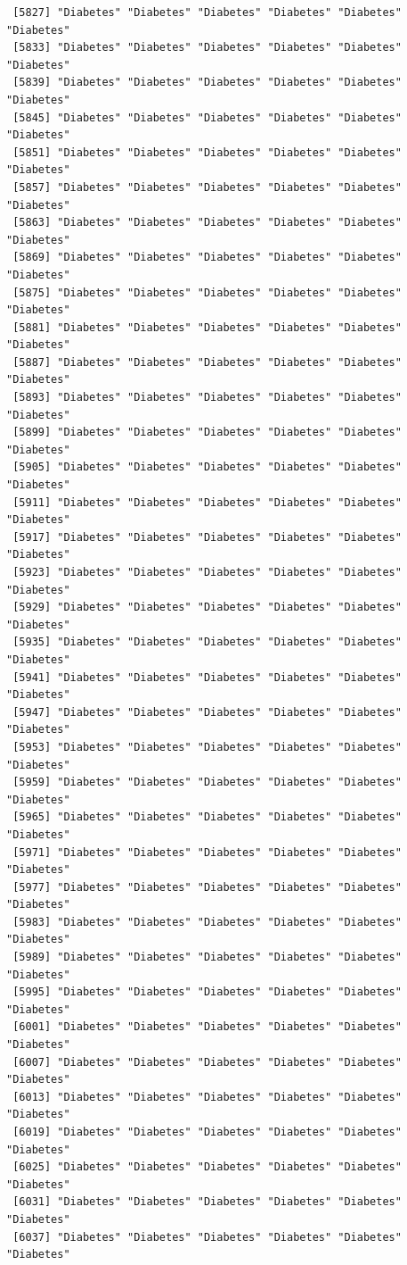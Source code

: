 \documentclass[
  letterpaper,
  DIV=11,
  numbers=noendperiod]{scrartcl}
\begin{document}
\begin{verbatim}
 [5827] "Diabetes" "Diabetes" "Diabetes" "Diabetes" "Diabetes" "Diabetes"
 [5833] "Diabetes" "Diabetes" "Diabetes" "Diabetes" "Diabetes" "Diabetes"
 [5839] "Diabetes" "Diabetes" "Diabetes" "Diabetes" "Diabetes" "Diabetes"
 [5845] "Diabetes" "Diabetes" "Diabetes" "Diabetes" "Diabetes" "Diabetes"
 [5851] "Diabetes" "Diabetes" "Diabetes" "Diabetes" "Diabetes" "Diabetes"
 [5857] "Diabetes" "Diabetes" "Diabetes" "Diabetes" "Diabetes" "Diabetes"
 [5863] "Diabetes" "Diabetes" "Diabetes" "Diabetes" "Diabetes" "Diabetes"
 [5869] "Diabetes" "Diabetes" "Diabetes" "Diabetes" "Diabetes" "Diabetes"
 [5875] "Diabetes" "Diabetes" "Diabetes" "Diabetes" "Diabetes" "Diabetes"
 [5881] "Diabetes" "Diabetes" "Diabetes" "Diabetes" "Diabetes" "Diabetes"
 [5887] "Diabetes" "Diabetes" "Diabetes" "Diabetes" "Diabetes" "Diabetes"
 [5893] "Diabetes" "Diabetes" "Diabetes" "Diabetes" "Diabetes" "Diabetes"
 [5899] "Diabetes" "Diabetes" "Diabetes" "Diabetes" "Diabetes" "Diabetes"
 [5905] "Diabetes" "Diabetes" "Diabetes" "Diabetes" "Diabetes" "Diabetes"
 [5911] "Diabetes" "Diabetes" "Diabetes" "Diabetes" "Diabetes" "Diabetes"
 [5917] "Diabetes" "Diabetes" "Diabetes" "Diabetes" "Diabetes" "Diabetes"
 [5923] "Diabetes" "Diabetes" "Diabetes" "Diabetes" "Diabetes" "Diabetes"
 [5929] "Diabetes" "Diabetes" "Diabetes" "Diabetes" "Diabetes" "Diabetes"
 [5935] "Diabetes" "Diabetes" "Diabetes" "Diabetes" "Diabetes" "Diabetes"
 [5941] "Diabetes" "Diabetes" "Diabetes" "Diabetes" "Diabetes" "Diabetes"
 [5947] "Diabetes" "Diabetes" "Diabetes" "Diabetes" "Diabetes" "Diabetes"
 [5953] "Diabetes" "Diabetes" "Diabetes" "Diabetes" "Diabetes" "Diabetes"
 [5959] "Diabetes" "Diabetes" "Diabetes" "Diabetes" "Diabetes" "Diabetes"
 [5965] "Diabetes" "Diabetes" "Diabetes" "Diabetes" "Diabetes" "Diabetes"
 [5971] "Diabetes" "Diabetes" "Diabetes" "Diabetes" "Diabetes" "Diabetes"
 [5977] "Diabetes" "Diabetes" "Diabetes" "Diabetes" "Diabetes" "Diabetes"
 [5983] "Diabetes" "Diabetes" "Diabetes" "Diabetes" "Diabetes" "Diabetes"
 [5989] "Diabetes" "Diabetes" "Diabetes" "Diabetes" "Diabetes" "Diabetes"
 [5995] "Diabetes" "Diabetes" "Diabetes" "Diabetes" "Diabetes" "Diabetes"
 [6001] "Diabetes" "Diabetes" "Diabetes" "Diabetes" "Diabetes" "Diabetes"
 [6007] "Diabetes" "Diabetes" "Diabetes" "Diabetes" "Diabetes" "Diabetes"
 [6013] "Diabetes" "Diabetes" "Diabetes" "Diabetes" "Diabetes" "Diabetes"
 [6019] "Diabetes" "Diabetes" "Diabetes" "Diabetes" "Diabetes" "Diabetes"
 [6025] "Diabetes" "Diabetes" "Diabetes" "Diabetes" "Diabetes" "Diabetes"
 [6031] "Diabetes" "Diabetes" "Diabetes" "Diabetes" "Diabetes" "Diabetes"
 [6037] "Diabetes" "Diabetes" "Diabetes" "Diabetes" "Diabetes" "Diabetes"

\end{verbatim}
\end{document}

